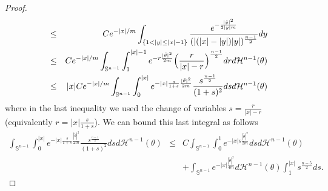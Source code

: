 \documentclass[11pt,letterpaper,reqno]{amsart}
\theoremstyle{plain}%
\theoremstyle{definition}
\numberwithin{equation}{section}
\numberwithin{figure}{section}
\begin{document}
\begin{proof}
\begin{eqnarray}
		&\leq&  	C e^{-|x|/m} \int_{\{1<|y| \leq |x|-1\}} \frac{e^{- \frac{|\tilde y|^2}{2|y|m}}}{(|(|x|-|y|)|y|)^\frac{n-1}{2}} dy\\\notag
			&\leq&  	C e^{-|x|/m} \int_{\mathbb{S}^{n-1}}\int_{1}^{|x|-1} e^{- r\frac{|\tilde \theta|^2}{2m}}\Big(\frac{r}{|x|-r}\Big)^\frac{n-1}{2} drd\mathcal{H}^{n-1}(\theta)\\\notag
		&\leq&	 |x|	C e^{-|x|/m}\int_{\mathbb{S}^{n-1}}\int_{0}^{|x|} e^{-  |x|\frac{s}{1+s}\frac{|\tilde \theta|^2}{2m}}\frac{s^\frac{n-1}{2}}{(1+s)^2} dsd\mathcal{H}^{n-1}(\theta)
	\end{eqnarray}
where in the last inequality we used the change of variables $s = \frac{r}{|x|-r}$ (equivalently $r= |x|\frac{s}{1+s}$). We can bound this last integral as follows
\begin{eqnarray*}
\int_{\mathbb{S}^{n-1}}\int_{0}^{|x|} e^{-  |x|\frac{s}{1+s}\frac{|\tilde \theta|^2}{2m}}\frac{s^\frac{n-1}{2}}{(1+s)^2} dsd\mathcal{H}^{n-1}(\theta)&\leq&  C\int_{\mathbb{S}^{n-1}}\int_{0}^{1} e^{-  |x|s\frac{|\tilde \theta|^2}{2m}} dsd\mathcal{H}^{n-1}(\theta) \\
&&+ \int_{\mathbb{S}^{n-1}} e^{-  |x|\frac{|\tilde \theta|^2}{4m}}d\mathcal{H}^{n-1}(\theta)\int_{1}^{|x|} s^\frac{n-5}{2} ds.
\end{eqnarray*}


\end{proof}
\end{document}
